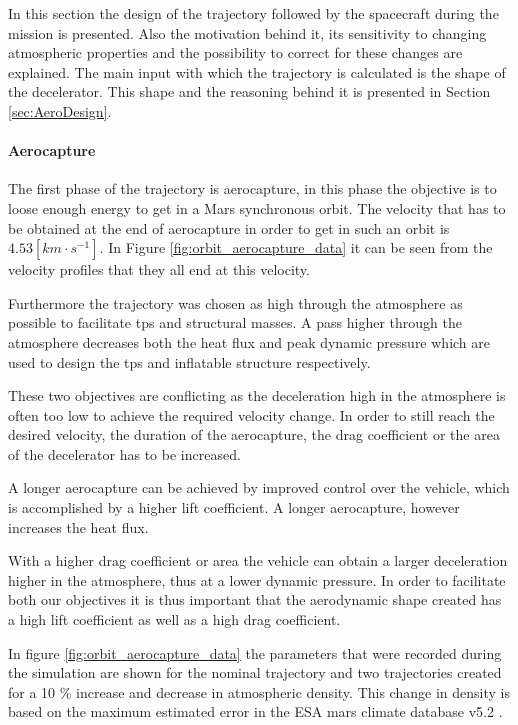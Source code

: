 In this section the design of the trajectory followed by the spacecraft during the mission is presented. Also the motivation behind it, its sensitivity to changing atmospheric properties and the possibility to correct for these changes are explained. The main input with which the trajectory is calculated is the shape of the decelerator. This shape and the reasoning behind it is presented in Section \ref{sec:AeroDesign}. %

\paragraph{Aerocapture}
The first phase of the trajectory is aerocapture, in this phase the objective is to loose enough energy to get in a Mars synchronous orbit. The velocity that has to be obtained at the end of aerocapture in order to get in such an orbit is $4.53 \left[km \cdot s^{-1}\right]$. In Figure \ref{fig:orbit_aerocapture_data} it can be seen from the velocity profiles that they all end at this velocity.

Furthermore the trajectory was chosen as high through the atmosphere as possible to facilitate \gls{tps} and structural masses. A pass higher through the atmosphere decreases both the heat flux and peak dynamic pressure which are used to design the \gls{tps} and inflatable structure respectively.

These two objectives are conflicting as the deceleration high in the atmosphere is often too low to achieve the required velocity change. In order to still reach the desired velocity, the duration of the aerocapture, the drag coefficient or the area of the decelerator has to be increased. 

A longer aerocapture can be achieved by improved control over the vehicle, which is accomplished by a higher lift coefficient.  A longer aerocapture, however increases the heat flux. 

With a higher drag coefficient or area the vehicle can obtain a larger deceleration higher in the atmosphere, thus at a lower dynamic pressure. In order to facilitate both our objectives it is thus important that the aerodynamic shape created has a high lift coefficient as well as a high drag coefficient.

In figure \ref{fig:orbit_aerocapture_data} the parameters that were recorded during the simulation are shown for the nominal trajectory and two trajectories created for a 10 \% increase and decrease in atmospheric density. This change in density is based on the maximum estimated error in the ESA mars climate database v5.2 \cite{Lewis2015}.

